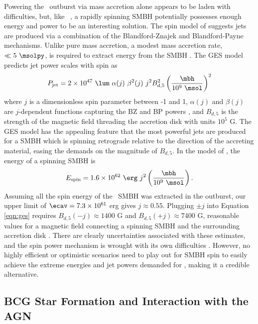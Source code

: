 \documentclass{emulateapj}
\begin{document}
Powering the \rbs\ outburst via mass accretion alone appears to be
laden with difficulties, but, like \ms\ \citep{msspin}, a rapidly
spinning SMBH potentially possesses enough energy and power to be an
interesting solution. The spin model of \citet[][GES
  hereafter]{gesspin} suggests jets are produced via a combination of
the Blandford-Znajek \citep[BZ;][]{bz} and Blandford-Payne
\citep[BP;][]{1982MNRAS.199..883B} mechanisms. Unlike pure mass
accretion, a modest mass accretion rate, \eg\ $\ll 5 ~\msolpy$, is
required to extract energy from the SMBH
\citep{1999ApJ...522..753M}. The GES model predicts jet power scales
with spin as
\begin{equation}
  P_{\rm{jet}} = 2 \times 10^{47} ~{\lum} ~\alpha(j) ~\beta^2(j) ~j^2
  B_{d,5}^2 \left(\frac{\mbh}{10^9 ~\msol}\right)^2
  \label{eqn:ges}
\end{equation}
where $j$ is a dimensionless spin parameter between -1 and 1,
$\alpha(j)$ and $\beta(j)$ are $j$-dependent functions capturing the
BZ and BP powers \citep[see][]{2009ApJ...699L..52G}, and $B_{d,5}$ is
the strength of the magnetic field threading the accretion disk with
units $10^5$ G. The GES model has the appealing feature that the most
powerful jets are produced for a SMBH which is spinning retrograde
relative to the direction of the accreting material, easing the
demands on the magnitude of $B_{d,5}$. In the model of
\citet{1999ApJ...522..753M}, the energy of a spinning SMBH is
\begin{equation}
  E_{\rm{spin}} = 1.6 \times 10^{62} ~{\erg} ~j^2
  \left(\frac{\mbh}{10^9 ~\msol}\right).
\end{equation}
Assuming all the spin energy of the \rbs\ SMBH was extracted in the
outburst, our upper limit of $\ecav = 7.3 \times 10^{61}$ erg gives $j
\approx 0.55$. Plugging $\pm j$ into Equation \ref{eqn:ges} requires
$B_{d,5}(-j) \approx 1400$ G and $B_{d,5}(+j) \approx 7400$ G,
reasonable values for a magnetic field connecting a spinning SMBH and
the surrounding accretion disk
\citep[\eg][]{2002Sci...295.1688K}. There are clearly uncertainties
associated with these estimates, and the spin power mechanism is
wrought with its own difficulties \citep[see][for discussion]{msspin}.
However, no highly efficient or optimistic scenarios need to play out
for SMBH spin to easily achieve the extreme energies and jet powers
demanded for \rbs, making it a credible alternative.

\subsection{BCG Star Formation and Interaction with the AGN}
\label{sec:bcg}
\end{document}
